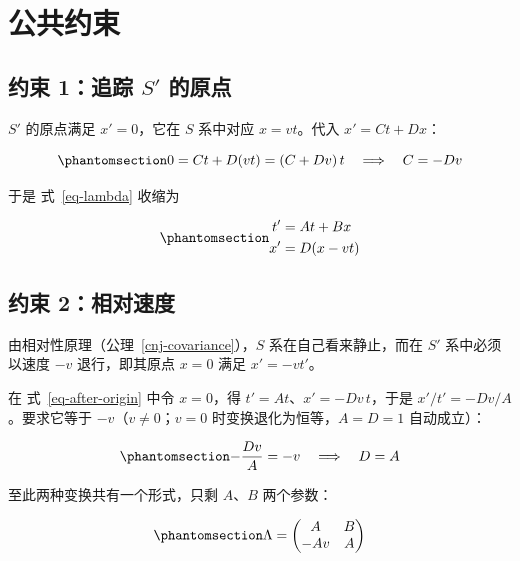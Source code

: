 \documentclass[
  chinese,
  a4paper,
  UTF8,
  12pt,
  oneside,
  openany]{ctexbook}
\theoremstyle{plain}
\theoremstyle{plain}
\theoremstyle{plain}
\theoremstyle{definition}
\theoremstyle{plain}
\theoremstyle{plain}
\theoremstyle{remark}
\begin{document}
\section{公共约束}\label{ux516cux5171ux7ea6ux675f}

\subsection{\texorpdfstring{约束 1：追踪 \(S'\)
的原点}{约束 1：追踪 S\textquotesingle{} 的原点}}\label{ux7ea6ux675f-1ux8ffdux8e2a-s-ux7684ux539fux70b9}

\(S'\) 的原点满足 \(x' = 0\)，它在 \(S\) 系中对应 \(x = vt\)。代入
\(x' = Ct + Dx\)：

\begin{equation}\protect\phantomsection\label{eq-constraint-origin}{
0 = C t + D(vt) = (C + Dv)\,t
\quad \Longrightarrow \quad
C = -Dv
}\end{equation}

于是 式~\ref{eq-lambda} 收缩为

\begin{equation}\protect\phantomsection\label{eq-after-origin}{
\begin{aligned}
t' &= A t + B x \\
x' &= D(x - vt)
\end{aligned}
}\end{equation}

\subsection{约束
2：相对速度}\label{ux7ea6ux675f-2ux76f8ux5bf9ux901fux5ea6}

由相对性原理（公理~\ref{cnj-covariance}），\(S\) 系在自己看来静止，而在
\(S'\) 系中必须以速度 \(-v\) 退行，即其原点 \(x = 0\) 满足
\(x' = -v t'\)。

在 式~\ref{eq-after-origin} 中令 \(x = 0\)，得
\(t' = A t\)、\(x' = -Dv\,t\)，于是 \(x'/t' = -Dv/A\)。要求它等于
\(-v\)（\(v \neq 0\)；\(v = 0\) 时变换退化为恒等，\(A = D = 1\)
自动成立）：

\begin{equation}\protect\phantomsection\label{eq-constraint-velocity}{
-\frac{Dv}{A} = -v
\quad \Longrightarrow \quad
D = A
}\end{equation}

至此两种变换共有一个形式，只剩 \(A\)、\(B\) 两个参数：

\begin{equation}\protect\phantomsection\label{eq-matrix-form}{
\Lambda = \begin{pmatrix} A & B \\ -Av & A \end{pmatrix}
}\end{equation}
\end{document}
